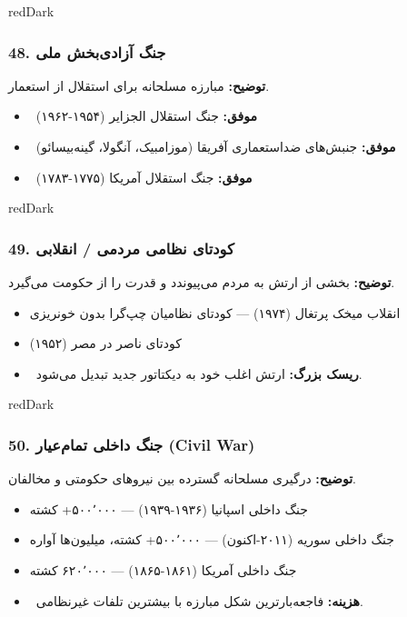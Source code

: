 \documentclass[a4paper,12pt]{article}
\newcommand{\success}[1]{\textcolor{greenPrimary}{\faCheckCircle\ \textbf{موفق:}} #1}
\newcommand{\methodnum}[1]{\textcolor{purpleLight}{\textbf{#1.}}}
\begin{document}
\begin{methodcard}{redDark}
\subsubsection{\methodnum{48} جنگ آزادی‌بخش ملی}
\textbf{توضیح:} مبارزه مسلحانه برای استقلال از استعمار.

\begin{itemize}[label=\textcolor{greenPrimary}{\faCheckCircle}]
  \item \success{جنگ استقلال الجزایر (۱۹۵۴-۱۹۶۲)}
  \item \success{جنبش‌های ضداستعماری آفریقا (موزامبیک، آنگولا، گینه‌بیسائو)}
  \item \success{جنگ استقلال آمریکا (۱۷۷۵-۱۷۸۳)}
\end{itemize}
\end{methodcard}

\begin{methodcard}{redDark}
\subsubsection{\methodnum{49} کودتای نظامی مردمی / انقلابی}
\textbf{توضیح:} بخشی از ارتش به مردم می‌پیوندد و قدرت را از حکومت می‌گیرد.

\begin{itemize}
  \item انقلاب میخک پرتغال (۱۹۷۴) — کودتای نظامیان چپ‌گرا بدون خونریزی
  \item کودتای ناصر در مصر (۱۹۵۲)
\end{itemize}
\begin{itemize}[label=\textcolor{redPrimary}{\faExclamationTriangle}]
  \item \textcolor{orangePrimary}{\faExclamationTriangle\ \textbf{ریسک بزرگ:}} ارتش اغلب خود به دیکتاتور جدید تبدیل می‌شود.
\end{itemize}
\end{methodcard}

\begin{methodcard}{redDark}
\subsubsection{\methodnum{50} جنگ داخلی تمام‌عیار (Civil War)}
\textbf{توضیح:} درگیری مسلحانه گسترده بین نیروهای حکومتی و مخالفان.

\begin{itemize}
  \item جنگ داخلی اسپانیا (۱۹۳۶-۱۹۳۹) — ۵۰۰٬۰۰۰+ کشته
  \item جنگ داخلی سوریه (۲۰۱۱-اکنون) — ۵۰۰٬۰۰۰+ کشته، میلیون‌ها آواره
  \item جنگ داخلی آمریکا (۱۸۶۱-۱۸۶۵) — ۶۲۰٬۰۰۰ کشته
\end{itemize}
\begin{itemize}[label=\textcolor{redPrimary}{\faExclamationTriangle}]
  \item \textcolor{redPrimary}{\faExclamationTriangle\ \textbf{هزینه:}} فاجعه‌بارترین شکل مبارزه با بیشترین تلفات غیرنظامی.
\end{itemize}
\end{methodcard}
\end{document}
